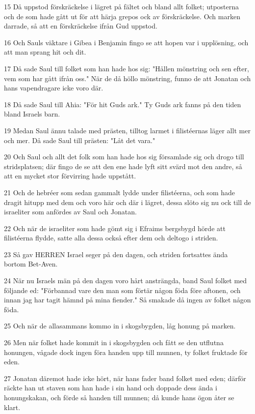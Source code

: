 \par 15 Då uppstod förskräckelse i lägret på fältet och bland allt folket; utposterna och de som hade gått ut för att härja grepos ock av förskräckelse. Och marken darrade, så att en förskräckelse ifrån Gud uppstod.
\par 16 Och Sauls väktare i Gibea i Benjamin fingo se att hopen var i upplösning, och att man sprang hit och dit.
\par 17 Då sade Saul till folket som han hade hos sig: "Hållen mönstring och sen efter, vem som har gått ifrån oss." När de då höllo mönstring, funno de att Jonatan och hans vapendragare icke voro där.
\par 18 Då sade Saul till Ahia: "För hit Guds ark." Ty Guds ark fanns på den tiden bland Israels barn.
\par 19 Medan Saul ännu talade med prästen, tilltog larmet i filistéernas läger allt mer och mer. Då sade Saul till prästen: "Låt det vara."
\par 20 Och Saul och allt det folk som han hade hos sig församlade sig och drogo till stridsplatsen; där fingo de se att den ene hade lyft sitt svärd mot den andre, så att en mycket stor förvirring hade uppstått.
\par 21 Och de hebréer som sedan gammalt lydde under filistéerna, och som hade dragit hitupp med dem och voro här och där i lägret, dessa slöto sig nu ock till de israeliter som anfördes av Saul och Jonatan.
\par 22 Och när de israeliter som hade gömt sig i Efraims bergsbygd hörde att filistéerna flydde, satte alla dessa också efter dem och deltogo i striden.
\par 23 Så gav HERREN Israel seger på den dagen, och striden fortsattes ända bortom Bet-Aven.
\par 24 När nu Israels män på den dagen voro hårt ansträngda, band Saul folket med följande ed: "Förbannad vare den man som förtär någon föda före aftonen, och innan jag har tagit hämnd på mina fiender." Så smakade då ingen av folket någon föda.
\par 25 Och när de allasammans kommo in i skogsbygden, låg honung på marken.
\par 26 Men när folket hade kommit in i skogsbygden och fått se den utflutna honungen, vågade dock ingen föra handen upp till munnen, ty folket fruktade för eden.
\par 27 Jonatan däremot hade icke hört, när hans fader band folket med eden; därför räckte han ut staven som han hade i sin hand och doppade dess ända i honungskakan, och förde så handen till munnen; då kunde hans ögon åter se klart.
